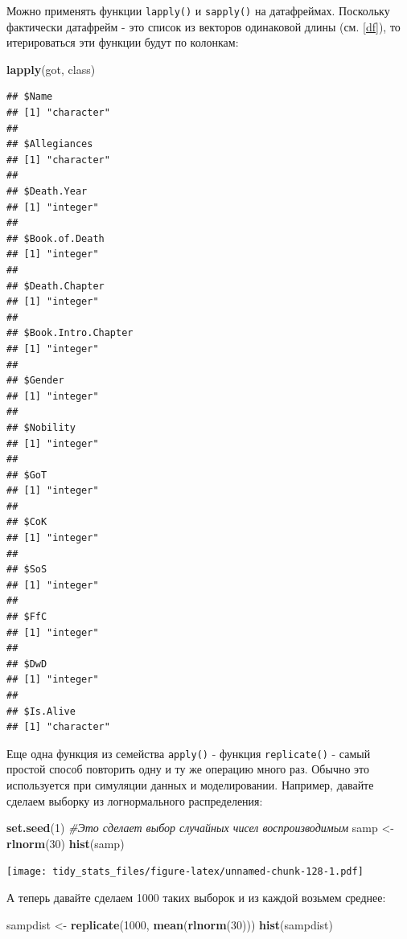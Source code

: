 \documentclass[]{book}
\newenvironment{Shaded}{\begin{snugshade}}{\end{snugshade}}
\newcommand{\KeywordTok}[1]{\textcolor[rgb]{0.13,0.29,0.53}{\textbf{#1}}}
\newcommand{\DecValTok}[1]{\textcolor[rgb]{0.00,0.00,0.81}{#1}}
\newcommand{\StringTok}[1]{\textcolor[rgb]{0.31,0.60,0.02}{#1}}
\newcommand{\CommentTok}[1]{\textcolor[rgb]{0.56,0.35,0.01}{\textit{#1}}}
\newcommand{\NormalTok}[1]{#1}
\begin{document}
Можно применять функции \texttt{lapply()} и \texttt{sapply()} на
датафреймах. Поскольку фактически датафрейм - это список из векторов
одинаковой длины (см. \ref{df}), то итерироваться эти функции будут по
колонкам:

\begin{Shaded}
\begin{Highlighting}[]
\KeywordTok{lapply}\NormalTok{(got, class)}
\end{Highlighting}
\end{Shaded}

\begin{verbatim}
## $Name
## [1] "character"
## 
## $Allegiances
## [1] "character"
## 
## $Death.Year
## [1] "integer"
## 
## $Book.of.Death
## [1] "integer"
## 
## $Death.Chapter
## [1] "integer"
## 
## $Book.Intro.Chapter
## [1] "integer"
## 
## $Gender
## [1] "integer"
## 
## $Nobility
## [1] "integer"
## 
## $GoT
## [1] "integer"
## 
## $CoK
## [1] "integer"
## 
## $SoS
## [1] "integer"
## 
## $FfC
## [1] "integer"
## 
## $DwD
## [1] "integer"
## 
## $Is.Alive
## [1] "character"
\end{verbatim}

Еще одна функция из семейства \texttt{apply()} - функция
\texttt{replicate()} - самый простой способ повторить одну и ту же
операцию много раз. Обычно это используется при симуляции данных и
моделировании. Например, давайте сделаем выборку из логнормального
распределения:

\begin{Shaded}
\begin{Highlighting}[]
\KeywordTok{set.seed}\NormalTok{(}\DecValTok{1}\NormalTok{) }\CommentTok{#Это сделает выбор случайных чисел воспроизводимым}
\NormalTok{samp <-}\StringTok{ }\KeywordTok{rlnorm}\NormalTok{(}\DecValTok{30}\NormalTok{)}
\KeywordTok{hist}\NormalTok{(samp)}
\end{Highlighting}
\end{Shaded}

\texttt{[image: tidy\_stats\_files/figure-latex/unnamed-chunk-128-1.pdf]}

А теперь давайте сделаем 1000 таких выборок и из каждой возьмем среднее:

\begin{Shaded}
\begin{Highlighting}[]
\NormalTok{sampdist <-}\StringTok{ }\KeywordTok{replicate}\NormalTok{(}\DecValTok{1000}\NormalTok{, }\KeywordTok{mean}\NormalTok{(}\KeywordTok{rlnorm}\NormalTok{(}\DecValTok{30}\NormalTok{)))}
\KeywordTok{hist}\NormalTok{(sampdist)}
\end{Highlighting}
\end{Shaded}
\end{document}
